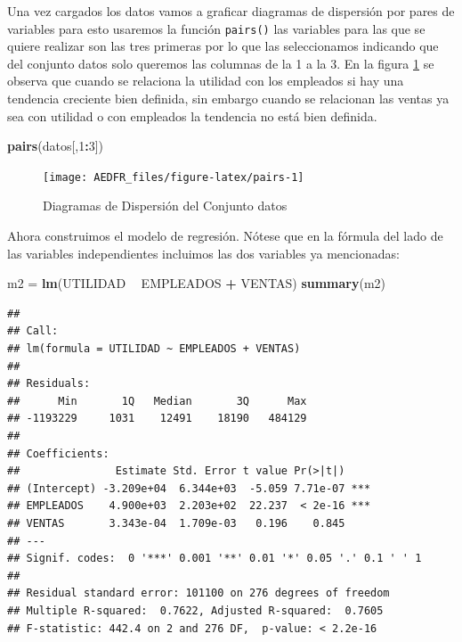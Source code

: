 \documentclass[letterpaper,]{book}
\newenvironment{Shaded}{\begin{snugshade}}{\end{snugshade}}
\newcommand{\DecValTok}[1]{\textcolor[rgb]{0.00,0.00,0.81}{#1}}
\newcommand{\KeywordTok}[1]{\textcolor[rgb]{0.13,0.29,0.53}{\textbf{#1}}}
\newcommand{\NormalTok}[1]{#1}
\newcommand{\OperatorTok}[1]{\textcolor[rgb]{0.81,0.36,0.00}{\textbf{#1}}}
\newcommand{\StringTok}[1]{\textcolor[rgb]{0.31,0.60,0.02}{#1}}
\begin{document}
Una vez cargados los datos vamos a graficar diagramas de dispersión por pares de variables para esto usaremos la función \texttt{pairs()} las variables para las que se quiere realizar son las tres primeras por lo que las seleccionamos indicando que del conjunto datos solo queremos las columnas de la 1 a la 3. En la figura \ref{fig:pairs} se observa que cuando se relaciona la utilidad con los empleados si hay una tendencia creciente bien definida, sin embargo cuando se relacionan las ventas ya sea con utilidad o con empleados la tendencia no está bien definida.

\begin{Shaded}
\begin{Highlighting}[]
\KeywordTok{pairs}\NormalTok{(datos[,}\DecValTok{1}\OperatorTok{:}\DecValTok{3}\NormalTok{])}
\end{Highlighting}
\end{Shaded}

\begin{figure}[!h]

{\centering \texttt{[image: AEDFR\_files/figure-latex/pairs-1]} 

}

\caption{Diagramas de Dispersión del Conjunto datos}\label{fig:pairs}
\end{figure}

Ahora construimos el modelo de regresión. Nótese que en la fórmula del lado de las variables independientes incluimos las dos variables ya mencionadas:

\begin{Shaded}
\begin{Highlighting}[]
\NormalTok{m2 =}\StringTok{ }\KeywordTok{lm}\NormalTok{(UTILIDAD }\OperatorTok{~}\StringTok{ }\NormalTok{EMPLEADOS }\OperatorTok{+}\StringTok{ }\NormalTok{VENTAS)}
\KeywordTok{summary}\NormalTok{(m2)}
\end{Highlighting}
\end{Shaded}

\begin{verbatim}
## 
## Call:
## lm(formula = UTILIDAD ~ EMPLEADOS + VENTAS)
## 
## Residuals:
##      Min       1Q   Median       3Q      Max 
## -1193229     1031    12491    18190   484129 
## 
## Coefficients:
##               Estimate Std. Error t value Pr(>|t|)    
## (Intercept) -3.209e+04  6.344e+03  -5.059 7.71e-07 ***
## EMPLEADOS    4.900e+03  2.203e+02  22.237  < 2e-16 ***
## VENTAS       3.343e-04  1.709e-03   0.196    0.845    
## ---
## Signif. codes:  0 '***' 0.001 '**' 0.01 '*' 0.05 '.' 0.1 ' ' 1
## 
## Residual standard error: 101100 on 276 degrees of freedom
## Multiple R-squared:  0.7622, Adjusted R-squared:  0.7605 
## F-statistic: 442.4 on 2 and 276 DF,  p-value: < 2.2e-16
\end{verbatim}
\end{document}
